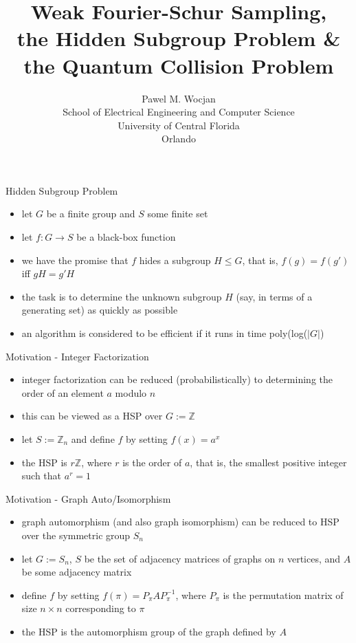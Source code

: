 \documentclass[slideColor]{prosper}
\title{Weak Fourier-Schur Sampling,\\ the Hidden Subgroup Problem \&\\ the Quantum Collision Problem}
\author{Pawel M. Wocjan\\[1ex]School of Electrical Engineering and Computer Science\\ University of Central Florida\\Orlando}
\newcommand{\Z}{{\mathbb{Z}}}
\renewcommand{\>}{\rangle}
\newcommand{\<}{\langle}
\begin{document}
\maketitle


\begin{slide}{Hidden Subgroup Problem}

\begin{itemize}
\item let $G$ be a finite group and $S$ some finite set
\item let $f : G \rightarrow S$ be a black-box function
\item we have the promise that $f$ hides a subgroup $H\le G$, that is, $f(g)=f(g')$ iff $gH=g'H$
\item the task is to determine the unknown subgroup $H$ (say, in terms of a generating set) as quickly as possible
\item an algorithm is considered to be efficient if it runs in time poly(log($|G|$)
\end{itemize}
\end{slide}


\begin{slide}{Motivation - Integer Factorization}
\begin{itemize}
\item integer factorization can be reduced (probabilistically) to determining the order of an element $a$ modulo $n$
\item this can be viewed as a HSP over $G:=\Z$
\item let $S:=\Z_n$ and define $f$ by setting $f(x)=a^x$
\item the HSP is $r\Z$, where $r$ is the order of $a$, that is, the smallest positive integer such that $a^r=1$
\end{itemize}
\end{slide}


\begin{slide}{Motivation - Graph Auto/Isomorphism}
\begin{itemize}
\item graph automorphism (and also graph isomorphism) can be reduced to HSP over the symmetric group $S_n$
\item let $G:=S_n$, $S$ be the set of adjacency matrices of graphs on $n$ vertices, and $A$ be some adjacency matrix
\item define $f$ by setting $f(\pi)=P_{\pi} A P_{\pi}^{-1}$, where $P_{\pi}$ is the permutation matrix of size $n\times n$ corresponding to $\pi$
\item the HSP is the automorphism group of the graph defined by $A$
\end{itemize}
\end{slide}
\end{document}
